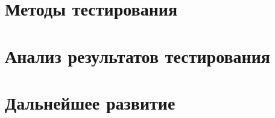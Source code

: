 \section{Методы тестирования}
\section{Анализ результатов тестирования}
\section{Дальнейшее развитие}
